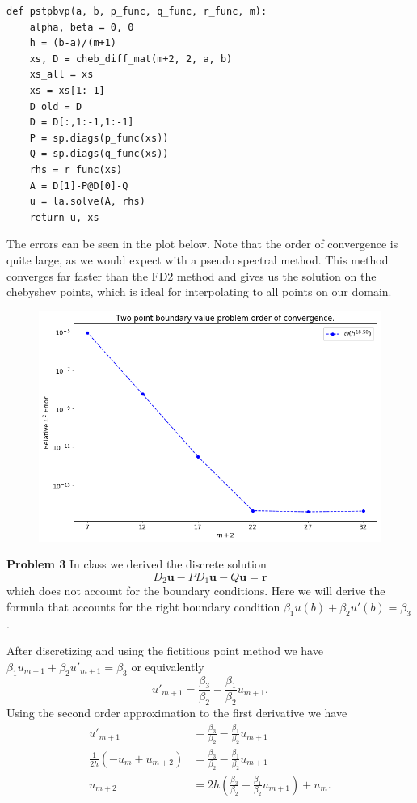 \documentclass[12pt]{article}
\newcommand{\problem}[1]{\hspace{-4 ex} \large \textbf{Problem #1} }
\renewcommand{\vec}[1]{\boldsymbol{\mathbf{#1}}}
\begin{document}
\begin{lstlisting}
def pstpbvp(a, b, p_func, q_func, r_func, m):
	alpha, beta = 0, 0
	h = (b-a)/(m+1)
	xs, D = cheb_diff_mat(m+2, 2, a, b)
	xs_all = xs
	xs = xs[1:-1]
	D_old = D
	D = D[:,1:-1,1:-1]
	P = sp.diags(p_func(xs))
	Q = sp.diags(q_func(xs))
	rhs = r_func(xs)
	A = D[1]-P@D[0]-Q
	u = la.solve(A, rhs)
	return u, xs
\end{lstlisting}

The errors can be seen in the plot below. Note that the order of convergence is quite large, as we would expect with a pseudo spectral method. This method converges far faster than the FD2 method and gives us the solution on the chebyshev points, which is ideal for interpolating to all points on our domain.

\begin{figure}[H]
	\includegraphics[width=1\textwidth]{hw03_p2b_pseudospectral}
	\centering
\end{figure}
\bigbreak

\problem{3} In class we derived the discrete solution
$$
D_2\vec{u} - P D_1 \vec{u} - Q \vec{u} = \vec{r}
$$
which does not account for the boundary conditions. Here we will derive the formula that accounts for the right boundary condition $\beta_1 u(b) + \beta_2 u'(b) = \beta_3$. \bigbreak

After discretizing and using the fictitious point method we have $\beta_1 u_{m+1} + \beta_2u'_{m+1} = \beta_3$ or equivalently
$$
u'_{m+1} = \frac{\beta_3}{\beta_2} - \frac{\beta_1}{\beta_2}u_{m+1}.
$$
Using the second order approximation to the first derivative we have
\begin{align*}
	u'_{m+1} &= \frac{\beta_3}{\beta_2} - \frac{\beta_1}{\beta_2}u_{m+1} \\
	\frac{1}{2h}(-u_m + u_{m+2}) &= \frac{\beta_3}{\beta_2} - \frac{\beta_1}{\beta_2}u_{m+1} \\
	u_{m+2} &= 2h \left ( \frac{\beta_3}{\beta_2} - \frac{\beta_1}{\beta_2}u_{m+1} \right) + u_m.
\end{align*}
\end{document}
